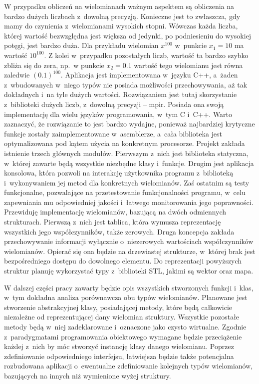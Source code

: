 W przypadku obliczeń na wielomianach ważnym aspektem są obliczenia na bardzo dużych liczbach z~dowolną precyzją. Konieczne jest to zwłaszcza, gdy mamy do czynienia z~wielomianami wysokich stopni. Wówczas każda liczba, której wartość bezwzględna jest większa od jedynki, po podniesieniu do wysokiej potęgi, jest bardzo duża. Dla przykładu wielomian $x^{100}$ w~punkcie $x_1=10$ ma wartość $10^{100}$. Z kolei w~przypadku pozostałych liczb, wartość ta bardzo szybko zbliża się do zera, np.\ w punkcie $x_2=0.1$ wartość tego wielomianu jest równa zaledwie $(0.1)^{100}$. Aplikacja jest implementowana w~języku C++, a~żaden z~wbudowanych w~niego typów nie posiada możliwości przechowywania, aż tak dokładnych i~na tyle dużych wartości. Rozwiązaniem jest tutaj skorzystanie z~biblioteki dużych liczb, z~dowolną precyzji – mpir. Posiada ona swoją implementację dla wielu języków programowania, w~tym C i~C++.  Warto zaznaczyć, że rozwiązanie to jest bardzo wydajne, ponieważ najbardziej krytyczne funkcje zostały zaimplementowane w~asemblerze, a~cała biblioteka jest optymalizowana pod kątem użycia na konkretnym procesorze.
Projekt zakłada istnienie trzech głównych modułów. Pierwszym z~nich jest biblioteka statyczna, w~której zawarte będą wszystkie niezbędne klasy i~funkcje. Drugim jest aplikacja konsolowa, która pozwoli na interakcję użytkownika programu z~biblioteką i~wykonywaniem jej metod dla konkretnych wielomianów. Zaś ostatnim są testy funkcjonalne, pozwalające na przetestowanie funkcjonalności programu, w~celu zapewniania mu odpowiedniej jakości i~łatwego monitorowania jego poprawności.
Przewiduję implementację wielomianów, bazującą na dwóch odmiennych strukturach. Pierwszą z~nich jest tablica, która wymusza reprezentację wszystkich jego współczynników, także zerowych. Druga koncepcja zakłada przechowywanie informacji wyłącznie o~niezerowych wartościach  współczynników wielomianów. Opierać się ona będzie na drzewiastej strukturze, w~której brak jest bezpośredniego dostępu do dowolnego elementu. Do reprezentacji powyższych struktur planuję wykorzystać typy z~biblioteki STL, jakimi są wektor oraz mapa.

W dalszej części pracy zawarty będzie opis wszystkich stworzonych funkcji i~klas, w~tym dokładna analiza porównawcza obu typów wielomianów. Planowane jest stworzenie abstrakcyjnej klasy, posiadającej metody, które będą całkowicie niezależne od reprezentującej dany wielomian struktury. Wszystkie pozostałe metody będą w~niej zadeklarowane i~oznaczone jako czysto wirtualne. Zgodnie z~paradygmatami programowania obiektowego wymagane będzie przeciążenie każdej z~nich by móc stworzyć instancję klasy danego wielomianu. Poprzez zdefiniowanie odpowiedniego interfejsu, łatwiejsza będzie także potencjalna rozbudowana aplikacji o~ewentualne zdefiniowanie kolejnych typów wielomianów, bazujących na innych niż wymienione wyżej struktury.

